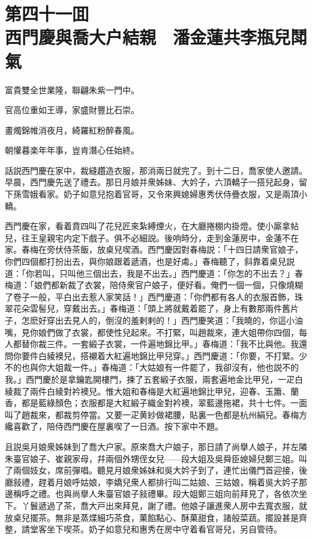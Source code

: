 
\chapter*{第四十一囬　\\西門慶與喬大户結親　潘金蓮共李瓶兒鬦氣}


\begin{myquote}
富貴雙全世業隆，聯翩朱紫一門中。

官高位重如王導，家盛財豐比石崇。

畫燭錦帷消夜月，綺羅紅粉醉春風。

朝懽暮楽年年事，豈肯潛心任始終。
\end{myquote}

話説西門慶在家中，裁縫趲造衣服，那消兩日就完了。到十二日，喬家使人邀請。早晨，西門慶先送了禮去。那日月娘并衆姊妹、大妗子，六頂轎子一搭兒起身，留下孫雪娥看家。奶子如意兒抱着官哥，又令來興媳婦惠秀伏侍疊衣服，又是兩頂小轎。

西門慶在家，看着賁四叫了花兒匠來紮縛煙火，在大廳捲棚内掛燈。使小廝拿帖兒，往王皇親宅内定下戲子。俱不必細説。後响時分，走到金蓮房中，金蓮不在家。春梅在旁伏侍茶飯，放桌兒喫酒。西門慶因對春梅説：「十四日請衆官娘子，你們四個都打扮出去，與你娘跟着遞酒，也是好䖏。」春梅聽了，斜靠着桌兒説道：「你若叫，只叫他三個出去，我是不出去。」西門慶道：「你怎的不出去？」春梅道：「娘們都新裁了衣裳，陪侍衆官户娘子，便好看。俺們一個一個，只像燒糊了卷子一般，平白出去惹人家笑話！」西門慶道：「你們都有各人的衣服首飾，珠翠花朵雲髻兒，穿戴出去。」春梅道：「頭上將就戴着罷了，身上有數那兩件舊片子，怎麽好穿出去見人的，倒沒的羞剌剌的！」西門慶笑道：「我曉的，你這小油嘴，見你娘們做了衣裳，都使性兒起來。不打緊，叫趙裁來，連大姐帶你四個，每人都替你裁三件。一套緞子衣裳，一件遍地錦比甲。」春梅道：「我不比與他。我還問你要件白綾襖兒，搭襯着大紅遍地錦比甲兒穿。」西門慶道：「你要，不打緊。少不的也與你大姐裁一件。」春梅道：「大姑娘有一件罷了，我卻沒有，他也説不的我。」西門慶於是拿鑰匙開樓門，揀了五套緞子衣服，兩套遍地金比甲兒，一疋白綾裁了兩件白綾對衿襖兒。惟大姐和春梅是大紅遍地錦比甲兒，迎春、玉簫、蘭香，都是藍綠顏色；衣服都是大紅緞子織金對衿襖，翠藍邊拖裙，共十七件。一面叫了趙裁來，都裁剪停當。又要一疋黄紗做裙腰，貼裏一色都是杭州絹兒。春梅方纔喜歡了，陪侍西門慶在屋裏喫了一日酒。按下家中不題。

且説吳月娘衆姊妹到了喬大户家。原來喬大户娘子，那日請了尚擧人娘子，幷左隣朱臺官娘子、崔親家母，幷兩個外甥侄女兒——段大姐及吳舜臣媳婦兒鄭三姐。叫了兩個妓女，席前彈唱。聽見月娘衆姊妹和吳大妗子到了，連忙出儀門首迎接，後廳敍禮，趕着月娘呼姑娘，李嬌兒衆人都排行叫二姑娘、三姑娘，稱着吳大妗子那邊稱呼之禮。也與尚擧人朱臺官娘子敍禮畢。段大姐鄭三姐向前拜見了，各依次坐下。丫鬟遞過了茶，喬大戸出來拜見，謝了禮。他娘子讓進衆人房中去寬衣服，就放桌兒擺茶。無非是蒸煠細巧茶食，菓餡點心、酥菓甜食，諸般菜蔬。擺設甚是齊整，請堂客坐下喫茶。奶子如意兒和惠秀在房中守着看官哥兒，另自管待。

